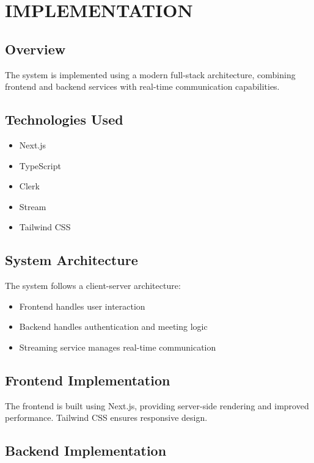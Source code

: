 \chapter{IMPLEMENTATION}

\section{Overview}

The system is implemented using a modern full-stack architecture, combining frontend and backend services with real-time communication capabilities.

\section{Technologies Used}

\begin{itemize}
\item Next.js
\item TypeScript
\item Clerk
\item Stream
\item Tailwind CSS
\end{itemize}

\section{System Architecture}

The system follows a client-server architecture:
\begin{itemize}
\item Frontend handles user interaction
\item Backend handles authentication and meeting logic
\item Streaming service manages real-time communication
\end{itemize}

\section{Frontend Implementation}

The frontend is built using Next.js, providing server-side rendering and improved performance. Tailwind CSS ensures responsive design.

\section{Backend Implementation}

